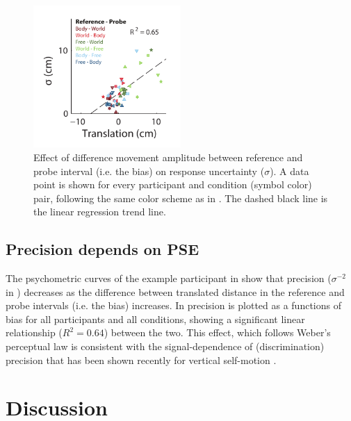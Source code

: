 \begin{figure}
    \includegraphics[width=0.5\textwidth]{src/paper3/figure5.pdf}

    \caption{Effect of difference movement amplitude between reference and probe interval (i.e. the bias) on response uncertainty ($\sigma$). A data point is shown for every participant and condition (symbol color) pair, following the same color scheme as in . The dashed black line is the linear regression trend line.}
    
    \label{p3:fig5}
\end{figure}

\subsection{Precision depends on PSE}
\label{p3:sec:precision}

The psychometric curves of the example participant in  show that precision ($\sigma^{-2}$ in ) decreases as the difference between translated distance in the reference and probe intervals (i.e. the bias) increases. In  precision is plotted as a functions of bias for all participants and all conditions, showing a significant linear relationship ($R^2 = 0.64$) between the two. This effect, which follows Weber's perceptual law \cite{fechner1860} is consistent with the signal-dependence of (discrimination) precision that has been shown recently for vertical self-motion \cite{nesti2014}.



\section{Discussion}

